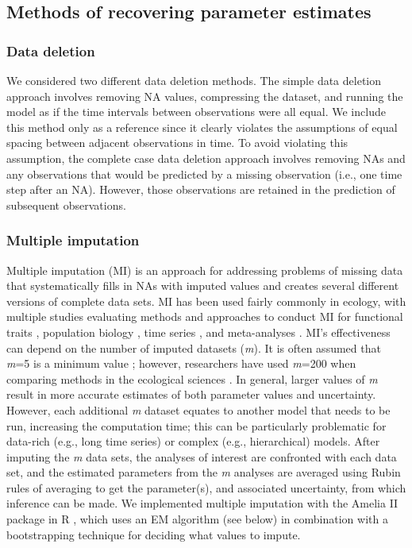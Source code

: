\documentclass{article}
\begin{document}
\subsection*{Methods of recovering parameter estimates}

\subsubsection*{Data deletion}
We considered two different data deletion methods. The simple data deletion approach involves removing NA values, compressing the dataset, and running the model as if the time intervals between observations were all equal. We include this method only as a reference since it clearly violates the assumptions of equal spacing between adjacent observations in time. To avoid violating this assumption, the complete case data deletion approach involves removing NAs and any observations that would be predicted by a missing observation (i.e., one time step after an NA). However, those observations are retained in the prediction of subsequent observations.


\subsubsection*{Multiple imputation}

Multiple imputation (MI) is an approach for addressing problems of missing data that systematically fills in NAs with imputed values and creates several different versions of complete data sets.  MI has been used fairly commonly in ecology, with multiple studies evaluating methods and approaches to conduct MI for functional traits \citep{taugourdeau_filling_2014,johnson_handling_2021,penone_imputation_2014}, population biology \citep{onkelinx_working_2017}, time series \citep{hui_gap-filling_2004}, and meta-analyses \citep{ellington_using_2015}.  MI’s effectiveness can depend on the number of imputed datasets (\textit{m}). It is often assumed that \textit{m}=5 is a minimum value \citep{honaker_what_2010}; however, researchers have used \textit{m}=200 when comparing methods in the ecological sciences \citep{onkelinx_working_2017}. In general, larger values of \textit{m} result in more accurate estimates of both parameter values and uncertainty. However, each additional \textit{m} dataset equates to another model that needs to be run, increasing the computation time; this can be particularly problematic for data-rich (e.g., long time series) or complex (e.g., hierarchical) models. After imputing the \textit{m} data sets, the analyses of interest are confronted with each data set, and the estimated parameters from the \textit{m} analyses are averaged using Rubin rules of averaging to get the parameter(s), and associated uncertainty, from which inference can be made. We implemented multiple imputation with the Amelia II package in R \citep{honaker2011}, which uses an EM algorithm (see below) in combination with a bootstrapping technique for deciding what values to impute. 
\end{document}
